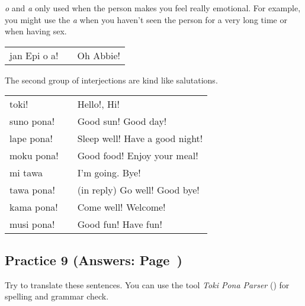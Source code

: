\textit{o} and \textit{a} only used when the person makes you feel really emotional. 
For example, you might use the \textit{a} when you haven't seen the person for a very long time or when having sex.  

\begin{supertabular}{p{5,5cm}|ll}
jan Epi o a! && Oh Abbie! \\
\end{supertabular} 

The second group of interjections are kind like salutations.

\begin{supertabular}{p{5,5cm}|ll}
toki! && Hello!, Hi! \\
suno pona! && Good sun! Good day! \\
lape pona! && Sleep well! Have a good night! \\
moku pona! && Good food! Enjoy your meal! \\
mi tawa && I'm going. Bye! \\
tawa pona! && (in reply) Go well! Good bye! \\
kama pona! && Come well! Welcome! \\
musi pona! && Good fun! Have fun! \\
\end{supertabular}  
%
\newpage
\subsection*{Practice 9 (Answers: Page~\pageref{'gender_unofficial_words_etc'})}
%
Try to translate these sentences. 
You can use the tool \textit{Toki Pona Parser} (\cite{www:rowa:02}) for spelling and grammar check. 

